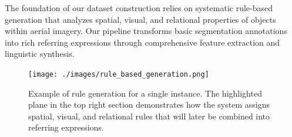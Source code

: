 The foundation of our dataset construction relies on systematic rule-based generation that analyzes spatial, visual, and relational properties of objects within aerial imagery. Our pipeline transforms basic segmentation annotations into rich referring expressions through comprehensive feature extraction and linguistic synthesis.

\begin{figure}[t]
\centering
\begin{minipage}{0.5\textwidth}
\centering
\texttt{[image: ./images/rule\_based\_generation.png]}
\end{minipage}%
\begin{minipage}{0.5\textwidth}
\centering
\hspace{-1cm}
\end{minipage}
\caption{Example of rule generation for a single instance. The highlighted plane in the top right section demonstrates how the system assigns spatial, visual, and relational rules that will later be combined into referring expressions.}
\label{fig:rule_example}
\end{figure}

